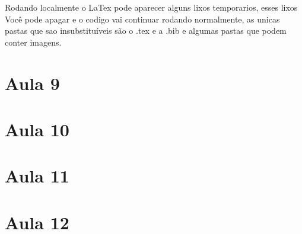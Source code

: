 Rodando localmente o LaTex pode aparecer alguns lixos temporarios, esses lixos Você pode apagar e o codigo vai continuar rodando normalmente, as unicas pastas que sao insubstituíveis são o .tex e a .bib e algumas pastas que podem conter imagens.

\section{Aula 9}


\section{Aula 10}
\lipsum[1-3]
\section{Aula 11}
\lipsum[1-3]
\section{Aula 12}
\lipsum[1-3]


